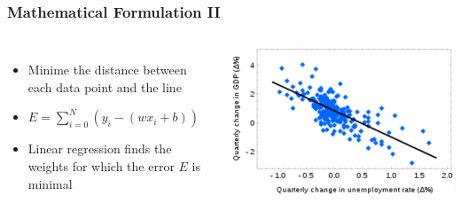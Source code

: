\begin{frame}
    \frametitle{Mathematical Formulation II}
    \begin{columns}
            \begin{itemize}
                \item Minime the distance between each data point and the line
                \item $ E = \sum_{i=0}^{N}(y_i - (w x_i + b))$
                \item Linear regression finds the weights for which the error $E$ is minimal
            \end{itemize}
            \includegraphics[width=1\linewidth]{linreg-pics/lg}\\
    \end{columns}
\end{frame}


